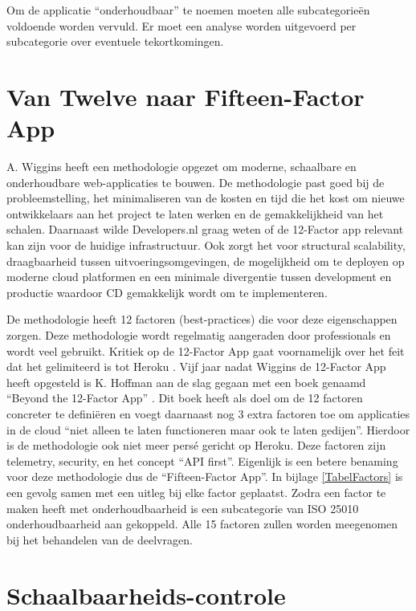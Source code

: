 Om de applicatie \enquote{onderhoudbaar} te noemen moeten alle subcategorieën voldoende worden vervuld. Er moet een analyse worden uitgevoerd per subcategorie over eventuele tekortkomingen.


\section{Van Twelve naar Fifteen-Factor App}

A. Wiggins \parencite{12Factor} heeft een methodologie opgezet om moderne, schaalbare en onderhoudbare web-applicaties te bouwen. De methodologie past goed bij de probleemstelling, het minimaliseren van de kosten en tijd die het kost om nieuwe ontwikkelaars aan het project te laten werken en de gemakkelijkheid van het schalen. Daarnaast wilde Developers.nl graag weten of de 12-Factor app relevant kan zijn voor de huidige infrastructuur. Ook zorgt het voor structural scalability, draagbaarheid tussen uitvoeringsomgevingen, de mogelijkheid om te deployen op moderne cloud platformen en een minimale divergentie tussen development en productie waardoor CD gemakkelijk wordt om te implementeren.

De methodologie heeft 12 factoren (best-practices) die voor deze eigenschappen zorgen. Deze methodologie wordt regelmatig aangeraden door professionals en wordt veel gebruikt. Kritiek op de 12-Factor App gaat voornamelijk over het feit dat het gelimiteerd is tot Heroku \parencite{AdaptingTwelveFactor}. Vijf jaar nadat Wiggins de 12-Factor App heeft opgesteld is K. Hoffman aan de slag gegaan met een boek genaamd \enquote{Beyond the 12-Factor App} \parencite{Beyond12Factor}. Dit boek heeft als doel om de 12 factoren concreter te definiëren en voegt daarnaast nog 3 extra factoren toe om applicaties in de cloud \enquote{niet alleen te laten functioneren maar ook te laten gedijen}. Hierdoor is de methodologie ook niet meer persé gericht op Heroku. Deze factoren zijn telemetry, security, en het concept \enquote{API first}. Eigenlijk is een betere benaming voor deze methodologie dus de \enquote{Fifteen-Factor App}. In bijlage \ref{TabelFactors} is een gevolg samen met een uitleg bij elke factor geplaatst. Zodra een factor te maken heeft met onderhoudbaarheid is een subcategorie van ISO 25010 onderhoudbaarheid aan gekoppeld. Alle 15 factoren zullen worden meegenomen bij het behandelen van de deelvragen.

\section{Schaalbaarheids-controle}

